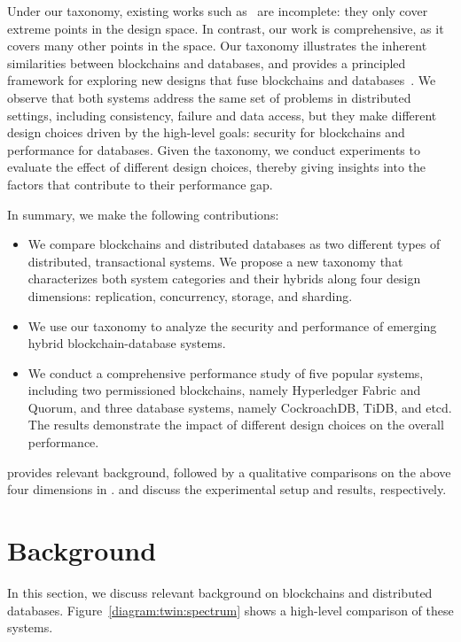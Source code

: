 Under our taxonomy, existing works such as~\cite{dinh2017blockbench} are incomplete: they only cover extreme
points in the design space. In contrast, our work is comprehensive, as it covers many other
points in the space. Our taxonomy illustrates the inherent similarities between blockchains and
databases, and provides a principled framework for exploring new designs that fuse blockchains and
databases~\cite{BlockchainMeetsDatabase,peng2020falcondb,veritas,el2019blockchaindb,mcconaghy2016bigchaindb,schuhknecht2019chainifydb}. 
We observe that both systems address the same set of
problems in distributed settings, including consistency, failure and data access, but they make different
design choices driven by the high-level goals: security for blockchains and performance for databases.  Given
the taxonomy, we conduct experiments to evaluate the effect of different design choices, thereby giving
insights into the factors that contribute to their performance gap.  

In summary, we make the following contributions:
\begin{itemize}
  \item We compare blockchains and distributed databases as two different types of distributed, transactional systems.  We propose a new taxonomy that characterizes both system categories and their hybrids along four design dimensions: replication, concurrency, storage, and sharding.

  \item We use our taxonomy to analyze the security and performance of emerging hybrid blockchain-database systems. 
  
  \item We conduct a comprehensive performance study of five popular systems, including  two permissioned blockchains, namely Hyperledger Fabric and Quorum, and three database systems, namely CockroachDB, TiDB, and etcd. The results demonstrate the impact of different design choices on the overall performance. 

\end{itemize}

 provides relevant background, followed by a qualitative comparisons on the above
four dimensions in .  and  discuss the experimental setup and
results, respectively. 

\section{Background}
\label{twin:sec:background}
In this section, we discuss relevant background on blockchains and distributed databases.
Figure~\ref{diagram:twin:spectrum} shows a high-level comparison of these systems.

